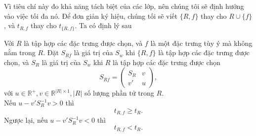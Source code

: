 Vì tiêu chí này đo khả năng tách biệt của các lớp, nên chúng tôi sẽ định hướng vào việc tối đa nó. Để đơn giản ký hiệu, chúng tối sẽ viết $\{R,f\}$ thay cho $R\cup \{f\}$, và $t_{R, f}$ thay cho  $t_{\{R, f\}}$. Ta có định lý sau
\begin{DL}\label{th2}
	Với $R$ là tập hợp các đặc trưng được chọn, và $f$ là một đặc trưng tùy ý mà không nằm trong $R$. Đặt $S_{Rf}$ là giá trị của $S_w$ khi $\{R, f\}$ là tập hợp các đặc trưng được chọn, và $S_R$ là giá trị của $S_w$ khi $R$ là tập hợp các đặc trưng được chọn
	\begin{equation}
		S_{Rf} = \begin{pmatrix}
			S_R & v\\
			v'& u
		\end{pmatrix},
	\end{equation}
	với $ u \in \mathbb{R}^{+}, v \in \mathbb{R}^{|R| \times 1}, |R| $ số lượng phần tử trong $R$.\\
	Nếu $u - v'S_R^{-1}v>0$ thì
	\begin{equation}
		t_{R,f}\ge t_R.
	\end{equation}
	Ngược lại, nếu $u - v'S_R^{-1}v<0$ thì
	\begin{equation}\label{eq7}
		t_{R,f}< t_R.
	\end{equation}
\end{DL}

